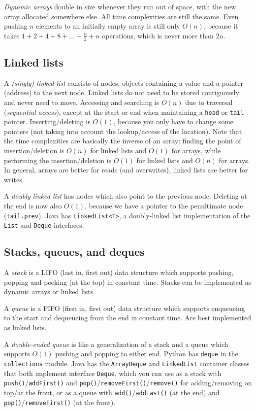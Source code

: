 \documentclass[table, xcdraw]{article}%
\begin{document}
\emph{Dynamic arrays} double in size whenever they run out of space, with the new array allocated somewhere else. All time complexities are still the same. Even pushing $n$ elements to an initially empty array is still only $O(n)$, because it takes $1 + 2 + 4 + 8 + ... + \frac{n}{2} + n$ operations, which is never more than $2n$.

\subsection{Linked lists}

A \emph{(singly) linked list} consists of nodes; objects containing a value and a pointer (address) to the next node. Linked lists do not need to be stored contiguously and never need to move. Accessing and searching is $O(n)$ due to traversal (\emph{sequential access}), except at the start or end when maintaining a \texttt{head} or \texttt{tail} pointer. Inserting/deleting is $O(1)$, because you only have to change some pointers (not taking into account the lookup/access of the location). Note that the time complexities are basically the inverse of an array: finding the point of insertion/deletion is $O(n)$ for linked lists and $O(1)$ for arrays, while performing the insertion/deletion is $O(1)$ for linked lists and $O(n)$ for arrays. In general, arrays are better for reads (and overwrites), linked lists are better for writes.

A \emph{doubly linked list} has nodes which also point to the previous node. Deleting at the end is now also $O(1)$, because we have a pointer to the penultimate node (\texttt{tail.prev}). Java has \texttt{LinkedList<T>}, a doubly-linked list implementation of the \texttt{List} and \texttt{Deque} interfaces.

\subsection{Stacks, queues, and deques}

A \emph{stack} is a LIFO (last in, first out) data structure which supports pushing, popping and peeking (at the top) in constant time. Stacks can be implemented as dynamic arrays or linked lists.

A \emph{queue} is a FIFO (first in, first out) data structure which supports enqueueing to the start and dequeueing from the end in constant time. Are best implemented as linked lists.

A \emph{double-ended queue} is like a generalization of a stack and a queue which supports $O(1)$ pushing and popping to either end. Python has \texttt{deque} in the \texttt{collections} module. Java has the \texttt{ArrayDeque} and \texttt{LinkedList} container classes that both implement interface \texttt{Deque}, which you can use as a stack with \texttt{push()}/\texttt{addFirst()} and \texttt{pop()}/\texttt{removeFirst()}/\texttt{remove()} for adding/removing on top/at the front, or as a queue with \texttt{add()}/\texttt{addLast()} (at the end) and \texttt{pop()}/\texttt{removeFirst()} (at the front).
\end{document}
